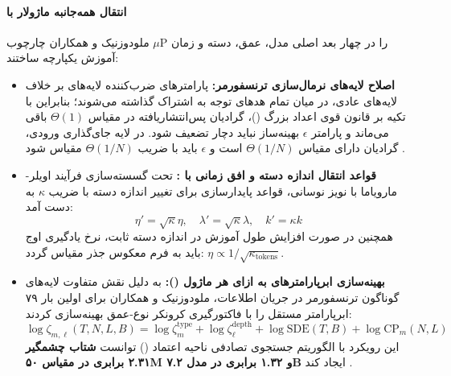 \paragraph*{انتقال همه‌جانبه ماژولار با }
ملودوزنیک و همکاران \cite{mlodozeniec2025completed} چارچوب $\mu$P را در چهار بعد اصلی مدل، عمق، دسته و زمان آموزش یکپارچه ساختند:
\begin{itemize}
    \item \textbf{اصلاح لایه‌های نرمال‌سازی ترنسفورمر:} پارامترهای ضرب‌کننده لایه‌های  بر خلاف لایه‌های عادی، در میان تمام هدهای توجه به اشتراک گذاشته می‌شوند؛ بنابراین با تکیه بر قانون قوی اعداد بزرگ ()، گرادیان پس‌انتشاریافته در مقیاس $\Theta(1)$ باقی می‌ماند و پارامتر $\epsilon$ بهینه‌ساز  نباید دچار تضعیف شود. در لایه جای‌گذاری ورودی، گرادیان دارای مقیاس $\Theta(1/N)$ است و $\epsilon$ باید با ضریب $\Theta(1/N)$ مقیاس شود \cite{mlodozeniec2025completed}.
    \item \textbf{قواعد انتقال اندازه دسته و افق زمانی با :} تحت گسسته‌سازی فرآیند اویلر-مارویاما با نویز نوسانی، قواعد پایدارسازی برای تغییر اندازه دسته با ضریب $\kappa$ به دست آمد:
    \begin{equation}
        \eta' = \sqrt{\kappa}\eta, \quad \lambda' = \sqrt{\kappa}\lambda, \quad k' = \kappa k
    \end{equation}
    همچنین در صورت افزایش طول آموزش در اندازه دسته ثابت، نرخ یادگیری اوج باید به فرم معکوس جذر مقیاس گردد: $\eta \propto 1/\sqrt{\kappa_{\text{tokens}}}$.
    \item \textbf{بهینه‌سازی ابرپارامترهای به ازای هر ماژول ():} به دلیل نقش متفاوت لایه‌های گوناگون ترنسفورمر در جریان اطلاعات، ملودوزنیک و همکاران برای اولین بار ۷۹ ابرپارامتر مستقل را با فاکتورگیری کرونکر نوع-عمق بهینه‌سازی کردند:
    \begin{equation}
        \log \zeta_{m,\ell}(T, N, L, B) = \log \zeta^{\text{type}}_m + \log \zeta^{\text{depth}}_\ell + \log \text{SDE}(T, B) + \log \text{CP}_m(N, L)
    \end{equation}
    این رویکرد با الگوریتم جستجوی تصادفی ناحیه اعتماد () توانست \textbf{شتاب چشمگیر ۲.۳۱ برابری در مقیاس ۵۰M و ۱.۳۲ برابری در مدل ۷.۲B} ایجاد کند \cite{mlodozeniec2025completed}.
\end{itemize}

